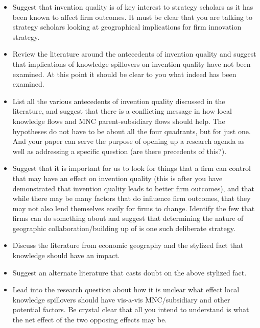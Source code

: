 \documentclass[12pt,letterpaper]{article}
\begin{document}
\begin{itemize}
\item Suggest that invention quality is of key interest to strategy scholars as it has been known to affect firm outcomes. It must be clear that you are talking to strategy scholars looking at geographical implications for firm innovation strategy.

\item Review the literature around the antecedents of invention quality and suggest that implications of knowledge spillovers on invention quality have not been examined. At this point it should be clear to you what indeed has been examined.

\item List all the various antecedents of invention quality discussed in the literature, and suggest that there is a conflicting message in how local knowledge flows and MNC parent-subsidiary flows should help. The hypotheses do not have to be about all the four quadrants, but for just one. And your paper can serve the purpose of opening up a research agenda as well as addressing a specific question (are there precedents of this?).

\item Suggest that it is important for us to look for things that a firm can control that may have an effect on invention quality (this is after you have demonstrated that invention quality leads to better firm outcomes), and that while there may be many factors that do influence firm outcomes, that they may not also lend themselves easily for firms to change. Identify the few that firms can do something about and suggest that determining the nature of geographic collaboration/building up of is one such deliberate strategy.

\item Discuss the literature from economic geography and the stylized fact that knowledge should have an impact. 

\item Suggest an alternate literature that casts doubt on the above stylized fact.

\item Lead into the research question about how it is unclear what effect local knowledge spillovers should have vis-a-vis MNC/subsidiary and other potential factors. Be crystal clear that all you intend to understand is what the net effect of the two opposing effects may be.


\end{itemize}
\end{document}
